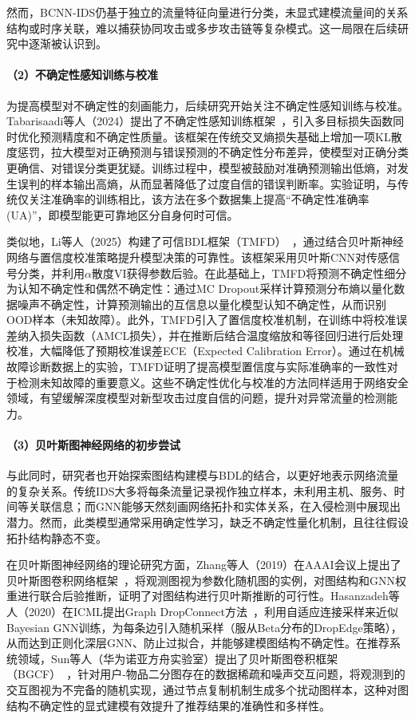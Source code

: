 然而，BCNN-IDS仍基于独立的流量特征向量进行分类，未显式建模流量间的关系结构或时序关联，难以捕获协同攻击或多步攻击链等复杂模式。这一局限在后续研究中逐渐被认识到。

\paragraph{（2）不确定性感知训练与校准}

为提高模型对不确定性的刻画能力，后续研究开始关注不确定性感知训练与校准。Tabarisaadi等人（2024）提出了不确定性感知训练框架~\cite{Tabarisaadi2024}，引入多目标损失函数同时优化预测精度和不确定性质量。该框架在传统交叉熵损失基础上增加一项KL散度惩罚，拉大模型对正确预测与错误预测的不确定性分布差异，使模型对正确分类更确信、对错误分类更犹疑。训练过程中，模型被鼓励对准确预测输出低熵，对发生误判的样本输出高熵，从而显著降低了过度自信的错误判断率。实验证明，与传统仅关注准确率的训练相比，该方法在多个数据集上提高``不确定性准确率(UA)''，即模型能更可靠地区分自身何时可信。

类似地，Li等人（2025）构建了可信BDL框架（TMFD）~\cite{Li2025TrustworthyBayesian}，通过结合贝叶斯神经网络与置信度校准策略提升模型决策的可靠性。该框架采用贝叶斯CNN对传感信号分类，并利用$\alpha$散度VI获得参数后验。在此基础上，TMFD将预测不确定性细分为认知不确定性和偶然不确定性：通过MC Dropout采样计算预测分布熵以量化数据噪声不确定性，计算预测输出的互信息以量化模型认知不确定性，从而识别OOD样本（未知故障）。此外，TMFD引入了置信度校准机制，在训练中将校准误差纳入损失函数（AMCL损失），并在推断后结合温度缩放和等径回归进行后处理校准，大幅降低了预期校准误差ECE（Expected Calibration Error）。通过在机械故障诊断数据上的实验，TMFD证明了提高模型置信度与实际准确率的一致性对于检测未知故障的重要意义。这些不确定性优化与校准的方法同样适用于网络安全领域，有望缓解深度模型对新型攻击过度自信的问题，提升对异常流量的检测能力。

\paragraph{（3）贝叶斯图神经网络的初步尝试}

与此同时，研究者也开始探索图结构建模与BDL的结合，以更好地表示网络流量的复杂关系。传统IDS大多将每条流量记录视作独立样本，未利用主机、服务、时间等关联信息；而GNN能够天然刻画网络拓扑和实体关系，在入侵检测中展现出潜力。然而，此类模型通常采用确定性学习，缺乏不确定性量化机制，且往往假设拓扑结构静态不变。

在贝叶斯图神经网络的理论研究方面，Zhang等人（2019）在AAAI会议上提出了贝叶斯图卷积网络框架~\cite{Zhang2019BGCN}，将观测图视为参数化随机图的实例，对图结构和GNN权重进行联合后验推断，证明了对图结构进行贝叶斯推断的可行性。Hasanzadeh等人（2020）在ICML提出Graph DropConnect方法~\cite{Hasanzadeh2020GDC}，利用自适应连接采样来近似Bayesian GNN训练，为每条边引入随机采样（服从Beta分布的DropEdge策略），从而达到正则化深层GNN、防止过拟合，并能够建模图结构不确定性。在推荐系统领域，Sun等人（华为诺亚方舟实验室）提出了贝叶斯图卷积框架（BGCF）~\cite{Sun2020}，针对用户-物品二分图存在的数据稀疏和噪声交互问题，将观测到的交互图视为不完备的随机实现，通过节点复制机制生成多个扰动图样本，这种对图结构不确定性的显式建模有效提升了推荐结果的准确性和多样性。

